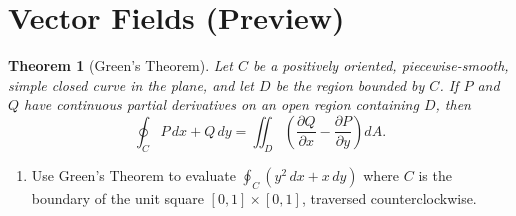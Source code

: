\documentclass[11pt]{article}
\newtheorem*{theorem*}{Theorem}
\begin{document}
\section*{Vector Fields (Preview)}

\begin{theorem*}[Green's Theorem]
Let $C$ be a positively oriented, piecewise-smooth, simple closed curve in the plane, and let $D$ be the region bounded by $C$. If $P$ and $Q$ have continuous partial derivatives on an open region containing $D$, then
\[
  \oint_C P \, dx + Q \, dy = \iint_D \left( \frac{\partial Q}{\partial x} - \frac{\partial P}{\partial y} \right) dA.
\]
\end{theorem*}

\begin{enumerate}[resume]
\item Use Green's Theorem to evaluate $\displaystyle \oint_C (y^2 \, dx + x \, dy)$ where $C$ is the boundary of the unit square $[0,1] \times [0,1]$, traversed counterclockwise.
\end{enumerate}
\end{document}
